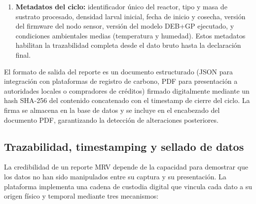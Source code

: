 \begin{enumerate}
    \item \textbf{Metadatos del ciclo:} identificador único del reactor, tipo y masa de sustrato procesado, densidad larval inicial, fecha de inicio y cosecha, versión del firmware del nodo sensor, versión del modelo DEB+GP ejecutado, y condiciones ambientales medias (temperatura y humedad). Estos metadatos habilitan la trazabilidad completa desde el dato bruto hasta la declaración final.
\end{enumerate}

El formato de salida del reporte es un documento estructurado (JSON para integración con plataformas de registro de carbono, PDF para presentación a autoridades locales o compradores de créditos) firmado digitalmente mediante un hash SHA-256 del contenido concatenado con el timestamp de cierre del ciclo. La firma se almacena en la base de datos y se incluye en el encabezado del documento PDF, garantizando la detección de alteraciones posteriores.

\subsection{Trazabilidad, timestamping y sellado de datos}
\label{subsec:cap5_trazabilidad}

La credibilidad de un reporte MRV depende de la capacidad para demostrar que los datos no han sido manipulados entre su captura y su presentación. La plataforma implementa una cadena de custodia digital que vincula cada dato a su origen físico y temporal mediante tres mecanismos:


